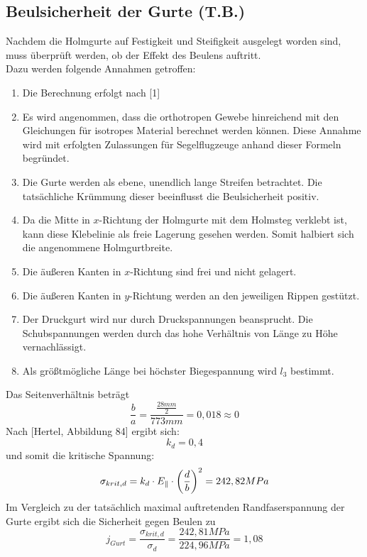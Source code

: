 \subsection{Beulsicherheit der Gurte (T.B.)}
Nachdem die Holmgurte auf Festigkeit und Steifigkeit ausgelegt worden sind, muss überprüft werden, ob der Effekt des Beulens auftritt.\\

\noindent Dazu werden folgende Annahmen getroffen:

\begin{enumerate}
	\item Die Berechnung erfolgt nach [1]
	\item Es wird angenommen, dass die orthotropen Gewebe hinreichend mit den Gleichungen für isotropes Material berechnet werden können. Diese Annahme wird mit erfolgten Zulassungen für Segelflugzeuge anhand dieser Formeln begründet.
	\item Die Gurte werden als ebene, unendlich lange Streifen betrachtet. Die tatsächliche Krümmung dieser beeinflusst die Beulsicherheit positiv.
	\item Da die Mitte in $x$-Richtung der Holmgurte mit dem Holmsteg verklebt ist, kann diese Klebelinie als freie Lagerung gesehen werden. Somit halbiert sich die angenommene Holmgurtbreite.
	\item Die äußeren Kanten in $x$-Richtung sind frei und nicht gelagert.
	\item Die äußeren Kanten in $y$-Richtung werden an den jeweiligen Rippen gestützt.
	\item Der Druckgurt wird nur durch Druckspannungen beansprucht. Die Schubspannungen werden durch das hohe Verhältnis von Länge zu  Höhe vernachlässigt.
	\item Als größtmögliche Länge bei höchster Biegespannung wird $l_{3}$ bestimmt.
\end{enumerate}
Das Seitenverhältnis beträgt 
\begin{equation}
	\frac{b}{a}=\frac{\frac{28 mm}{2}}{773 mm}=0,018 \approx 0
\end{equation}
\noindent Nach [Hertel, Abbildung 84] ergibt sich:
\begin{equation}
	k_{d}=0,4
\end{equation}
und somit die kritische Spannung:
\begin{equation}
	\sigma_{krit,d}=k_{d}\cdot E_{\parallel}\cdot\biggl(\frac{d}{b}\biggr)^{2}\\
	= 242,82 MPa
\end{equation}
Im Vergleich zu der tatsächlich maximal auftretenden Randfaserspannung der Gurte ergibt sich die Sicherheit gegen Beulen zu 
\begin{equation}
	j_{Gurt}=\frac{\sigma_{krit,d}}{\sigma_{d}}=\frac{242,81 MPa}{224,96 MPa}=1,08
\end{equation}


